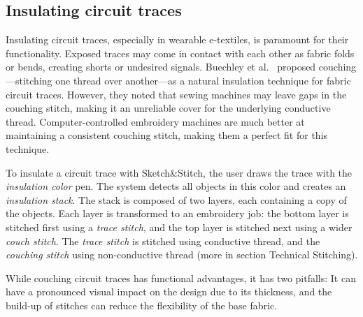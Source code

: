\documentclass[header.tex]{subfiles}
\begin{document}
\subsection{Insulating circuit traces}
Insulating circuit traces, especially in wearable e-textiles, is paramount for their functionality. %
Exposed traces may come in contact with each other as fabric folds or bends, creating shorts or undesired signals. Buechley et al.\ \cite{Buechley2009} proposed couching---stitching one thread over another---as a natural insulation technique for fabric circuit traces. However, they noted that sewing machines may leave gaps in the couching stitch, making it an unreliable cover for the underlying conductive thread. Computer-controlled embroidery machines are much better at maintaining a consistent couching stitch, making them a perfect fit for this technique. 


To insulate a circuit trace with Sketch\&Stitch, the user draws the trace with the \textit{insulation color} pen. The system detects all objects in this color and creates an \textit{insulation stack}. The stack is composed of two layers, each containing a copy of the objects. Each layer is transformed to an embroidery job: the bottom layer is stitched first using a \textit{trace stitch}, and the top layer is stitched next using a wider \textit{couch stitch}. The \textit{trace stitch} is stitched using conductive thread, and the \textit{couching stitch} using non-conductive thread (more in section Technical Stitching).

While couching circuit traces has functional advantages, it has two pitfalls: It can have a pronounced visual impact on the design due to its thickness, and the build-up of stitches can reduce the flexibility of the base fabric.




 

\end{document}
